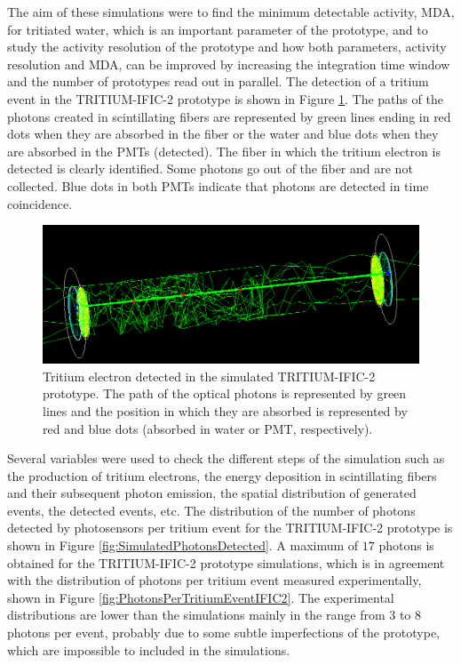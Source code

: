 The aim of these simulations were to find the minimum detectable activity, MDA, for tritiated water, which is an important parameter of the prototype, and to study the activity resolution of the prototype and how both parameters, activity resolution and MDA, can be improved by increasing the integration time window and the number of prototypes read out in parallel. The detection of a tritium event in the TRITIUM-IFIC-2 prototype is shown in Figure \ref{fig:TritiumEventDetectedInSimulatedPrototype}. The paths of the photons created in scintillating fibers are represented by green lines ending in red dots when they are absorbed in the fiber or the water and blue dots when they are absorbed in the PMTs (detected). The fiber in which the tritium electron is detected is clearly identified. Some photons go out of the fiber and are not collected. Blue dots in both PMTs indicate that photons are detected in time coincidence.

\begin{figure}[hbtp]
\centering
\includegraphics[scale=0.35]{Figures/8SimulationsResults/82TRITIUMMonitor/821TRITIUMIFIC2/EventDetectedInTRITIUMIFIC2.png}
\caption{Tritium electron detected in the simulated TRITIUM-IFIC-2 prototype. The path of the optical photons is represented by green lines and the position in which they are absorbed is represented by red and blue dots (absorbed in water or PMT, respectively).\label{fig:TritiumEventDetectedInSimulatedPrototype}}
\end{figure}

Several variables were used to check the different steps of the simulation such as the production of tritium electrons, the energy deposition in scintillating fibers and their subsequent photon emission, the spatial distribution of generated events, the detected events, etc. The distribution of the number of photons detected by photosensors per tritium event for the TRITIUM-IFIC-2 prototype is shown in Figure \ref{fig:SimulatedPhotonsDetected}. A maximum of $17$ photons is obtained for the TRITIUM-IFIC-2 prototype simulations, which is in agreement with the distribution of photons per tritium event measured experimentally, shown in Figure \ref{fig:PhotonsPerTritiumEventIFIC2}. The experimental distributions are lower than the simulations mainly in the range from $3$ to $8$ photons per event, probably due to some subtle imperfections of the prototype, which are impossible to included in the simulations.

